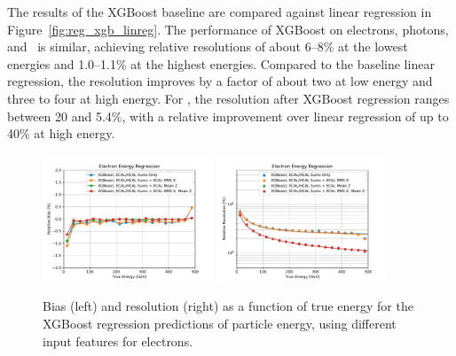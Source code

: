 The results of the XGBoost baseline are compared against linear regression in Figure~\ref{fig:reg_xgb_linreg}. The performance of XGBoost on electrons, photons, and \pizero\ is similar, achieving relative resolutions of about 6--8\% at the lowest energies and 1.0--1.1\% at the highest energies.  Compared to the baseline linear regression, the resolution improves by a factor of about two at low energy and three to four at high energy.  For \chpi, the resolution after XGBoost regression ranges between 20 and 5.4\%, with a relative improvement over linear regression of up to 40\% at high energy.

\begin{figure}[htbp]
\centering
\includegraphics[width=0.45\textwidth]{Images/Calo/bias_vs_E_EleFixed_xgb_ecalmoms_zoom.pdf}
\includegraphics[width=0.45\textwidth]{Images/Calo/res_vs_E_EleFixed_xgb_ecalmoms_fits.pdf}
\caption{Bias (left) and resolution (right) as a function of true energy for the XGBoost regression predictions of particle energy, using different input features for electrons.\label{fig:reg_xgb_ecalmoms}}
\end{figure}

